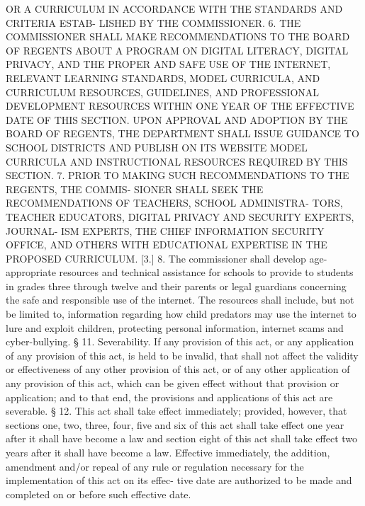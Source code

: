  OR A CURRICULUM IN ACCORDANCE WITH THE  STANDARDS  AND  CRITERIA  ESTAB-
 LISHED BY THE COMMISSIONER.
   6. THE COMMISSIONER SHALL MAKE RECOMMENDATIONS TO THE BOARD OF REGENTS
 ABOUT A PROGRAM ON DIGITAL LITERACY, DIGITAL PRIVACY, AND THE PROPER AND
 SAFE  USE OF THE INTERNET, RELEVANT LEARNING STANDARDS, MODEL CURRICULA,
 AND  CURRICULUM  RESOURCES,  GUIDELINES,  AND  PROFESSIONAL  DEVELOPMENT
 RESOURCES  WITHIN  ONE YEAR OF THE EFFECTIVE DATE OF THIS SECTION.  UPON
 APPROVAL AND ADOPTION BY THE BOARD  OF  REGENTS,  THE  DEPARTMENT  SHALL
 ISSUE  GUIDANCE  TO  SCHOOL  DISTRICTS  AND PUBLISH ON ITS WEBSITE MODEL
 CURRICULA AND INSTRUCTIONAL RESOURCES REQUIRED BY THIS SECTION.
   7. PRIOR TO MAKING SUCH RECOMMENDATIONS TO THE  REGENTS,  THE  COMMIS-
 SIONER  SHALL  SEEK  THE RECOMMENDATIONS OF TEACHERS, SCHOOL ADMINISTRA-
 TORS, TEACHER EDUCATORS, DIGITAL PRIVACY AND SECURITY EXPERTS,  JOURNAL-
 ISM  EXPERTS,  THE  CHIEF  INFORMATION  SECURITY OFFICE, AND OTHERS WITH
 EDUCATIONAL EXPERTISE IN THE PROPOSED CURRICULUM.
   [3.] 8. The commissioner shall develop age-appropriate  resources  and
 technical  assistance for schools to provide to students in grades three
 through twelve and their parents or legal guardians concerning the  safe
 and  responsible  use  of the internet. The resources shall include, but
 not be limited to, information regarding how child predators may use the
 internet to lure and exploit children, protecting personal  information,
 internet scams and cyber-bullying.
   §  11.  Severability. If any provision of this act, or any application
 of any provision of this act, is held to  be  invalid,  that  shall  not
 affect the validity or effectiveness of any other provision of this act,
 or  of  any other application of any provision of this act, which can be
 given effect without that provision or application; and to that end, the
 provisions and applications of this act are severable.
   § 12. This act shall take effect immediately; provided, however,  that
 sections  one,  two,  three,  four,  five and six of this act shall take
 effect one year after it shall have become a law and  section  eight  of
 this  act  shall take effect two years after it shall have become a law.
 Effective immediately, the addition, amendment and/or repeal of any rule
 or regulation necessary for the implementation of this act on its effec-
 tive date are authorized to be made and  completed  on  or  before  such
 effective date.
